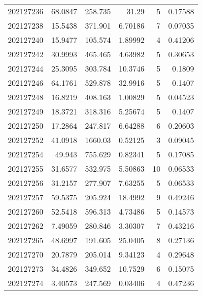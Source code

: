 \begin{tabular}{rrrrrr}
 202127236 &         68.0847  &      258.735  &           31.29    &           5 & 0.17588 \\
 202127238 &         15.5438  &      371.901  &            6.70186 &           7 & 0.07035 \\
 202127240 &         15.9477  &      105.574  &            1.89992 &           4 & 0.41206 \\
 202127242 &         30.9993  &      465.465  &            4.63982 &           5 & 0.30653 \\
 202127244 &         25.3095  &      303.784  &           10.3746  &           5 & 0.1809  \\
 202127246 &         64.1761  &      529.878  &           32.9916  &           5 & 0.1407  \\
 202127248 &         16.8219  &      408.163  &            1.00829 &           5 & 0.04523 \\
 202127249 &         18.3721  &      318.316  &            5.25674 &           5 & 0.1407  \\
 202127250 &         17.2864  &      247.817  &            6.64288 &           6 & 0.20603 \\
 202127252 &         41.0918  &     1660.03   &            0.52125 &           3 & 0.09045 \\
 202127254 &         49.943   &      755.629  &            0.82341 &           5 & 0.17085 \\
 202127255 &         31.6577  &      532.975  &            5.50863 &          10 & 0.06533 \\
 202127256 &         31.2157  &      277.907  &            7.63255 &           5 & 0.06533 \\
 202127257 &         59.5375  &      205.924  &           18.4992  &           9 & 0.49246 \\
 202127260 &         52.5418  &      596.313  &            4.73486 &           5 & 0.14573 \\
 202127262 &          7.49059 &      280.846  &            3.30307 &           7 & 0.43216 \\
 202127265 &         48.6997  &      191.605  &           25.0405  &           8 & 0.27136 \\
 202127270 &         20.7879  &      205.014  &            9.34123 &           4 & 0.29648 \\
 202127273 &         34.4826  &      349.652  &           10.7529  &           6 & 0.15075 \\
 202127274 &          3.40573 &      247.569  &            0.03406 &           4 & 0.47236 \\

\end{tabular}
